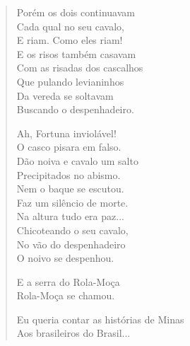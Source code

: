 \begin{verse}
\quad\quad\quad{}Porém os dois continuavam\\
\quad\quad\quad{}Cada qual no seu cavalo,\\
\quad\quad\quad{}E riam. Como eles riam!\\
\quad\quad\quad{}E os risos também casavam\\
\quad\quad\quad{}Com as risadas dos cascalhos\\
\quad\quad\quad{}Que pulando levianinhos\\
\quad\quad\quad{}Da vereda se soltavam\\
\quad\quad\quad{}Buscando o despenhadeiro.

\quad\quad\quad{}Ah, Fortuna inviolável!\\
\quad\quad\quad{}O casco pisara em falso.\\
\quad\quad\quad{}Dão noiva e cavalo um salto\\
\quad\quad\quad{}Precipitados no abismo.\\
\quad\quad\quad{}Nem o baque se escutou.\\
\quad\quad\quad{}Faz um silêncio de morte.\\
\quad\quad\quad{}Na altura tudo era paz...\\
\quad\quad\quad{}Chicoteando o seu cavalo,\\
\quad\quad\quad{}No vão do despenhadeiro\\
\quad\quad\quad{}O noivo se despenhou.

\quad\quad\quad{}E a serra do Rola-Moça\\
\quad\quad\quad{}Rola-Moça se chamou.

Eu queria contar as histórias de Minas\\
Aos brasileiros do Brasil...


\end{verse}
